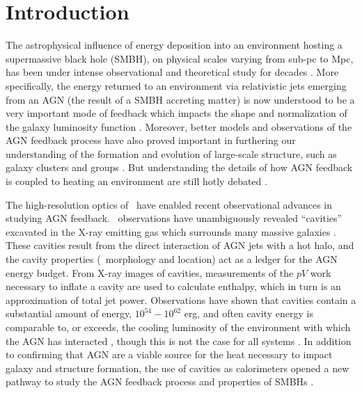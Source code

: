 \documentclass{emulateapj}
\begin{document}

\section{Introduction}
\label{sec:intro}

The astrophysical influence of energy deposition into an environment
hosting a supermassive black hole (SMBH), on physical scales varying
from sub-pc to Mpc, has been under intense observational and
theoretical study for decades \citep[\eg][]{1969Natur.223..690L,
1974MNRAS.166..513S, cowie77, 1981ApJ...248...55B,
1982MNRAS.199..883B, 1982MNRAS.200..115S, 1984ARA&A..22..471R,
burns90, kaiser91, 1993MNRAS.263..323T, 1995MNRAS.276..663B,
1997MNRAS.288..355B, magorrian, 1998A&A...331L...1S,
1999MNRAS.303..188K, 2000ApJ...534L.135M, voitbryan, best05,
haradent}. More specifically, the energy returned to an environment
via relativistic jets emerging from an AGN (the result of a SMBH
accreting matter) is now understood to be a very important mode of
feedback which impacts the shape and normalization of the galaxy
luminosity function \citep{croton06, bower06, saro06,
sijacki07}. Moreover, better models and observations of the AGN
feedback process have also proved important in furthering our
understanding of the formation and evolution of large-scale structure,
such as galaxy clusters and groups \citep[see, for
example,][]{2008MNRAS.386.1309M, minggroups}. But understanding the
details of how AGN feedback is coupled to heating an environment are
still hotly debated \citep[\eg][]{2008ASPC..386..343D}.

The high-resolution optics of \chandra\ have enabled recent
observational advances in studying AGN feedback. \chandra\
observations have unambiguously revealed ``cavities'' excavated in the
X-ray emitting gas which surrounds many massive galaxies
\citep[\eg][]{2000ApJ...534L.135M, perseus1, schindler01}. These
cavities result from the direct interaction of AGN jets with a hot
halo, and the cavity properties (\ie\ morphology and location) act as
a ledger for the AGN energy budget. From X-ray images of cavities,
measurements of the $pV$ work necessary to inflate a cavity are used
to calculate enthalpy, which in turn is an approximation of total jet
power. Observations have shown that cavities contain a substantial
amount of energy, $10^{54}-10^{62}$ erg, and often cavity energy is
comparable to, or exceeds, the cooling luminosity of the environment
with which the AGN has interacted \citep{birzan04, rafferty06}, though
this is not the case for all systems \citep{dunn08}. In addition to
confirming that AGN are a viable source for the heat necessary to
impact galaxy and structure formation, the use of cavities as
calorimeters opened a new pathway to study the AGN feedback process
and properties of SMBHs \citep{2009ApJ...698..594M}.
\end{document}
